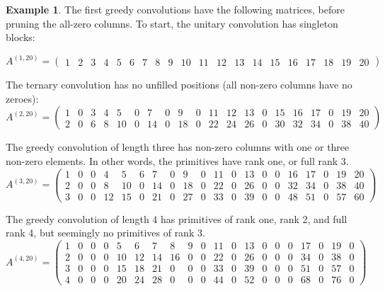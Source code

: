 \documentclass[12pt]{article}
\theoremstyle{definition}
\newtheorem{mexample}{Example}
\theoremstyle{remark}
\theoremstyle{plain}
\begin{document}
\begin{mexample}
The first greedy convolutions have  the following matrices, before pruning the all-zero columns.
To start, the unitary convolution has singleton blocks:

\begin{displaymath}
A^{(1,20)} =
\left(\begin{array}{rrrrrrrrrrrrrrrrrrrr}
1 & 2 & 3 & 4 & 5 & 6 & 7 & 8 & 9 & 10 & 11 & 12 & 13 & 14 & 15 & 16 & 17 & 18 & 19 & 20
\end{array}\right)
\end{displaymath}

The ternary convolution has no unfilled positions (all non-zero columns have no zeroes):
\begin{displaymath}
A^{(2,20)} =
\left(\begin{array}{rrrrrrrrrrrrrrrrrrrr}
1 & 0 & 3 & 4 & 5 & 0 & 7 & 0 & 9 & 0 & 11 & 12 & 13 & 0 & 15 & 16 & 17 & 0 & 19 & 20 \\
2 & 0 & 6 & 8 & 10 & 0 & 14 & 0 & 18 & 0 & 22 & 24 & 26 & 0 & 30 & 32 & 34 & 0 & 38 & 40
\end{array}\right)
\end{displaymath}

The greedy convolution of length three has non-zero columns with one or three non-zero elements.
In other words, the primitives have rank one, or full rank 3.
\begin{displaymath}
A^{(3,20)} =
\left(\begin{array}{rrrrrrrrrrrrrrrrrrrr}
1 & 0 & 0 & 4 & 5 & 6 & 7 & 0 & 9 & 0 & 11 & 0 & 13 & 0 & 0 & 16 & 17 & 0 & 19 & 20 \\
2 & 0 & 0 & 8 & 10 & 0 & 14 & 0 & 18 & 0 & 22 & 0 & 26 & 0 & 0 & 32 & 34 & 0 & 38 & 40 \\
3 & 0 & 0 & 12 & 15 & 0 & 21 & 0 & 27 & 0 & 33 & 0 & 39 & 0 & 0 & 48 & 51 & 0 & 57 & 60
\end{array}\right)
\end{displaymath}

The greedy convolution of length 4 has primitives of rank one, rank 2, and full rank 4, but seemingly no
primitives of rank 3.
\begin{displaymath}
A^{(4,20)} =
\left(\begin{array}{rrrrrrrrrrrrrrrrrrrr}
1 & 0 & 0 & 0 & 5 & 6 & 7 & 8 & 9 & 0 & 11 & 0 & 13 & 0 & 0 & 0 & 17 & 0 & 19 & 0 \\
2 & 0 & 0 & 0 & 10 & 12 & 14 & 16 & 0 & 0 & 22 & 0 & 26 & 0 & 0 & 0 & 34 & 0 & 38 & 0 \\
3 & 0 & 0 & 0 & 15 & 18 & 21 & 0 & 0 & 0 & 33 & 0 & 39 & 0 & 0 & 0 & 51 & 0 & 57 & 0 \\
4 & 0 & 0 & 0 & 20 & 24 & 28 & 0 & 0 & 0 & 44 & 0 & 52 & 0 & 0 & 0 & 68 & 0 & 76 & 0
\end{array}\right)
\end{displaymath}


\end{mexample}
\end{document}
